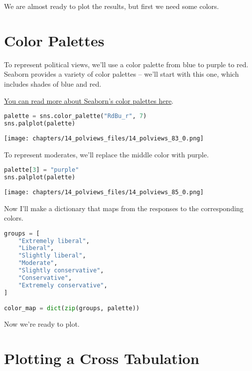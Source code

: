 We are almost ready to plot the results, but first we need some colors.

\hypertarget{color-palettes}{%
\section{Color Palettes}\label{color-palettes}}

To represent political views, we'll use a color palette from blue to
purple to red. Seaborn provides a variety of color palettes -- we'll
start with this one, which includes shades of blue and red.

\href{https://seaborn.pydata.org/tutorial/color_palettes.html}{You can
read more about Seaborn's color palettes here}.

\begin{lstlisting}[language=Python,style=source]
palette = sns.color_palette("RdBu_r", 7)
sns.palplot(palette)
\end{lstlisting}

\begin{center}
\texttt{[image: chapters/14\_polviews\_files/14\_polviews\_83\_0.png]}
\end{center}

To represent moderates, we'll replace the middle color with purple.

\begin{lstlisting}[language=Python,style=source]
palette[3] = "purple"
sns.palplot(palette)
\end{lstlisting}

\begin{center}
\texttt{[image: chapters/14\_polviews\_files/14\_polviews\_85\_0.png]}
\end{center}

Now I'll make a dictionary that maps from the responses to the
corresponding colors.

\begin{lstlisting}[language=Python,style=source]
groups = [
    "Extremely liberal",
    "Liberal",
    "Slightly liberal",
    "Moderate",
    "Slightly conservative",
    "Conservative",
    "Extremely conservative",
]

color_map = dict(zip(groups, palette))
\end{lstlisting}

Now we're ready to plot.

\hypertarget{plotting-a-cross-tabulation}{%
\section{Plotting a Cross
Tabulation}\label{plotting-a-cross-tabulation}}

